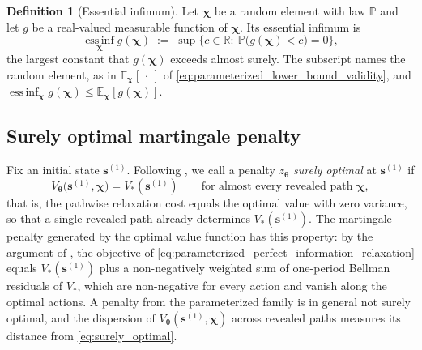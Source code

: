\documentclass[11pt]{article}
\theoremstyle{definition}
\newtheorem{definition}{Definition}
\begin{document}
\begin{definition}[Essential infimum]
\label{def:essinf}
Let \(\boldsymbol{\chi}\) be a random element with law \(\mathbb P\) and let \(g\) be a real-valued measurable function of \(\boldsymbol{\chi}\). Its essential infimum is
\[
\operatorname*{ess\,inf}_{\boldsymbol{\chi}} g(\boldsymbol{\chi}) \;:=\; \sup\bigl\{c\in\mathbb R:\ \mathbb P\bigl(g(\boldsymbol{\chi})<c\bigr)=0\bigr\},
\]
the largest constant that \(g(\boldsymbol{\chi})\) exceeds almost surely. The subscript names the random element, as in \(\mathbb E_{\boldsymbol{\chi}}[\,\cdot\,]\) of \eqref{eq:parameterized_lower_bound_validity}, and \(\operatorname*{ess\,inf}_{\boldsymbol{\chi}} g(\boldsymbol{\chi})\le\mathbb E_{\boldsymbol{\chi}}[g(\boldsymbol{\chi})]\).
\end{definition}

\subsection{Surely optimal martingale penalty}

Fix an initial state \(\boldsymbol{s}^{(1)}\). Following \citet{belomestny2019}, we call a penalty \(z_{\boldsymbol{\theta}}\) \emph{surely optimal} at \(\boldsymbol{s}^{(1)}\) if
\begin{equation}
\label{eq:surely_optimal}
V_{\boldsymbol{\theta}}\bigl(\boldsymbol{s}^{(1)},\boldsymbol{\chi}\bigr)=V_*(\boldsymbol{s}^{(1)})
\qquad\text{for almost every revealed path }\boldsymbol{\chi},
\end{equation}
that is, the pathwise relaxation cost equals the optimal value with zero variance, so that a single revealed path already determines \(V_*(\boldsymbol{s}^{(1)})\). The martingale penalty generated by the optimal value function has this property: by the argument of \citet[Proposition~4.1]{Brown2017or}, the objective of \eqref{eq:parameterized_perfect_information_relaxation} equals \(V_*(\boldsymbol{s}^{(1)})\) plus a non-negatively weighted sum of one-period Bellman residuals of \(V_*\), which are non-negative for every action and vanish along the optimal actions. A penalty from the parameterized family is in general not surely optimal, and the dispersion of \(V_{\boldsymbol{\theta}}(\boldsymbol{s}^{(1)},\boldsymbol{\chi})\) across revealed paths measures its distance from \eqref{eq:surely_optimal}.
\end{document}
